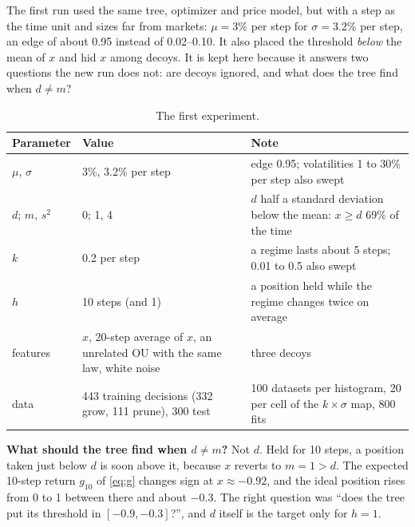 \documentclass[11pt,a4paper]{article}
\newcommand{\1}{\mathbf{1}}
\begin{document}
The first run used the same tree, optimizer and price model, but with a step as the time unit and sizes far from markets: $\mu=3\%$ per step for $\sigma=3.2\%$ per step, an edge of about 0.95 instead of 0.02--0.10. It also placed the threshold \emph{below} the mean of $x$ and hid $x$ among decoys. It is kept here because it answers two questions the new run does not: are decoys ignored, and what does the tree find when $d\neq m$?
\begin{table}[H]
\centering\small
\begin{tabularx}{\linewidth}{@{}l L L@{}}
\toprule
Parameter & Value & Note\\
\midrule
$\mu$, $\sigma$ & 3\%, 3.2\% per step & edge 0.95; volatilities 1 to 30\% per step also swept\\
$d$; $m$, $s^2$ & 0; 1, 4 & $d$ half a standard deviation below the mean: $x\ge d$ 69\% of the time\\
$k$ & 0.2 per step & a regime lasts about 5 steps; 0.01 to 0.5 also swept\\
$h$ & 10 steps (and 1) & a position held while the regime changes twice on average\\
features & $x$, 20-step average of $x$, an unrelated OU with the same law, white noise & three decoys\\
data & 443 training decisions (332 grow, 111 prune), 300 test & 100 datasets per histogram, 20 per cell of the $k\times\sigma$ map, 800 fits\\
\bottomrule
\end{tabularx}
\caption{The first experiment.}
\end{table}
\textbf{What should the tree find when $d\neq m$?} Not $d$. Held for 10 steps, a position taken just below $d$ is soon above it, because $x$ reverts to $m=1>d$. The expected 10-step return $g_{10}$ of \eqref{eq:g} changes sign at $x\approx-0.92$, and the ideal position rises from 0 to 1 between there and about $-0.3$. The right question was ``does the tree put its threshold in $[-0.9,-0.3]$?'', and $d$ itself is the target only for $h=1$.
\end{document}
